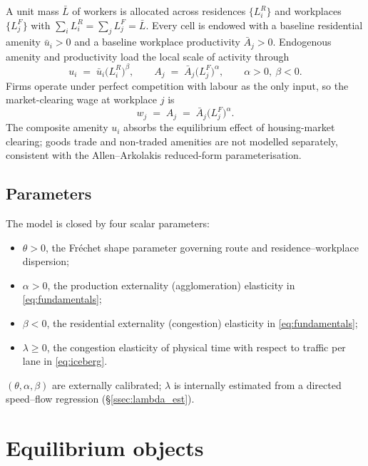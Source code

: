 \documentclass[12pt]{article}
\newcommand{\Lbar}{\bar L}
\newcommand{\ubar}{\bar u}
\newcommand{\Abar}{\bar A}
\begin{document}
A unit mass $\Lbar$ of workers is allocated across residences
$\{L_i^R\}$ and workplaces $\{L_j^F\}$ with
$\sum_i L_i^R=\sum_j L_j^F=\Lbar$.  Every cell is endowed with a
baseline residential amenity $\ubar_i>0$ and a baseline workplace
productivity $\Abar_j>0$.  Endogenous amenity and productivity load
the local scale of activity through
\begin{equation}
  u_i\;=\;\ubar_i\bigl(L_i^R\bigr)^{\beta},
  \qquad
  A_j\;=\;\Abar_j\bigl(L_j^F\bigr)^{\alpha},
  \qquad \alpha>0,\ \beta<0.
  \label{eq:fundamentals}
\end{equation}
Firms operate under perfect competition with labour as the only
input, so the market-clearing wage at workplace $j$ is
\begin{equation}
  w_j\;=\;A_j\;=\;\Abar_j\bigl(L_j^F\bigr)^{\alpha}.
  \label{eq:wage}
\end{equation}
The composite amenity $u_i$ absorbs the equilibrium effect of
housing-market clearing; goods trade and non-traded amenities are
not modelled separately, consistent with the Allen--Arkolakis
reduced-form parameterisation.

\subsection{Parameters}

The model is closed by four scalar parameters:
\begin{itemize}[leftmargin=2em,itemsep=0.2em]
  \item $\theta>0$, the Fr\'echet shape parameter governing route and
        residence--workplace dispersion;
  \item $\alpha>0$, the production externality (agglomeration)
        elasticity in \eqref{eq:fundamentals};
  \item $\beta<0$, the residential externality (congestion)
        elasticity in \eqref{eq:fundamentals};
  \item $\lambda\ge 0$, the congestion elasticity of physical time with
        respect to traffic per lane in \eqref{eq:iceberg}.
\end{itemize}
$(\theta,\alpha,\beta)$ are externally calibrated; $\lambda$ is
internally estimated from a directed speed--flow regression
(\S\ref{ssec:lambda_est}).

\section{Equilibrium objects}\label{sec:objects}
\end{document}
